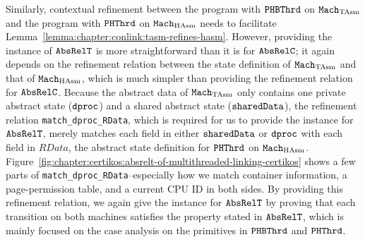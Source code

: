  Similarly, 
 contextual refinement between the program with ${{\mathrm{\texttt{PHBThrd}}}}$ on ${\mathrm{\texttt{Mach}}}_{\mathrm{TAsm}}$ and 
 the program with ${{\mathrm{\texttt{PHThrd}}}}$ on ${\mathrm{\texttt{Mach}}}_{\mathrm{HAsm}}$
 needs to facilitate Lemma~\ref{lemma:chapter:conlink:tasm-refines-hasm}.
However, providing the instance of ${{\mathrm{\texttt{AbsRelT}}}}$ is more straightforward than it is for  ${{\mathrm{\texttt{AbsRelC}}}}$;
it again depends on the refinement relation between the state definition of ${\mathrm{\texttt{Mach}}}_{\mathrm{TAsm}}$ and that of ${\mathrm{\texttt{Mach}}}_{\mathrm{HAsm}}$,
which is much simpler than providing the refinement relation for  ${{\mathrm{\texttt{AbsRelC}}}}$.
Because the abstract data of ${\mathrm{\texttt{Mach}}}_{\mathrm{TAsm}}$ only contains one private abstract state (${\mathrm{\texttt{dproc}}}$) and 
a shared abstract state (${\mathrm{\texttt{sharedData}}}$), 
the refinement relation \lstinline$match_dproc_RData$, which is required for us to provide the instance for ${{\mathrm{\texttt{AbsRelT}}}}$,
merely matches each field in either ${\mathrm{\texttt{sharedData}}}$ or ${\mathrm{\texttt{dproc}}}$ with
each field in $RData$, the abstract state definition for ${{\mathrm{\texttt{PHThrd}}}}$ on ${\mathrm{\texttt{Mach}}}_{\mathrm{HAsm}}$.
Figure~\ref{fig:chapter:certikos:absrelt-of-multithreaded-linking-certikos} shows a few parts of \lstinline$match_dproc_RData$--especially how we match container information, a page-permission table, and a current CPU ID in both sides.
By providing this refinement relation,
we again give the instance for ${{\mathrm{\texttt{AbsRelT}}}}$ by proving 
that each transition on both machines satisfies the property stated in ${{\mathrm{\texttt{AbsRelT}}}}$,
which is mainly focused on the case analysis on the primitives in  ${{\mathrm{\texttt{PHBThrd}}}}$ and ${{\mathrm{\texttt{PHThrd}}}}$.



